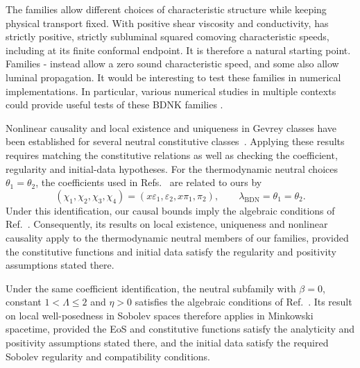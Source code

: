 The families allow different choices of characteristic structure while
keeping physical transport fixed. With positive shear viscosity and
conductivity,  has strictly positive, strictly subluminal
squared comoving characteristic speeds, including at its finite conformal
endpoint. It is therefore a natural starting point. Families - instead
allow a zero sound characteristic speed, and some also allow luminal
propagation. It would be interesting to test these families in numerical implementations.
In particular, various numerical studies in multiple contexts could provide useful tests of these BDNK families \cite{PandyaPretorius, PandyaMostPretorius, PandyaIdealGas, BantilanBeaFigueras, BeaFigueras, BhambureEtAl, FantiniRubio, ClarisseEtAl,  ShumEtAl}.

\label{sec:nonlinear-discussion}
Nonlinear causality and local existence and uniqueness in Gevrey classes
have been established for several neutral constitutive
classes~\cite{BDN2018,DisconziGevrey,BDN2019}. Applying these results
requires matching the constitutive relations as well as checking the
coefficient, regularity and initial-data hypotheses. For the thermodynamic
neutral choices $\theta_1=\theta_2$, the coefficients used in
Refs.~\cite{BDN2019,BDG} are related to ours by
\[
 (\chi_1,\chi_2,\chi_3,\chi_4)
 =(x\varepsilon_1,\varepsilon_2,x\pi_1,\pi_2),\qquad
 \lambda_{\mathrm{BDN}}=\theta_1=\theta_2.
\]
Under this identification, our causal bounds imply the algebraic
conditions of Ref.~\cite{BDN2019}. Consequently, its results on local
existence, uniqueness and nonlinear causality apply to the thermodynamic
neutral members of our families, provided the constitutive functions
and initial data satisfy the regularity and positivity assumptions
stated there.

Under the same coefficient identification, the neutral 
subfamily with $\beta=0$, constant $1<\Lambda\leq2$ and $\eta>0$
satisfies the algebraic conditions of Ref.~\cite{BDG}. Its result on
local well-posedness in Sobolev spaces therefore applies in Minkowski
spacetime, provided the EoS and constitutive functions satisfy the
analyticity and positivity assumptions stated there, and the initial
data satisfy the required Sobolev regularity and compatibility
conditions.

